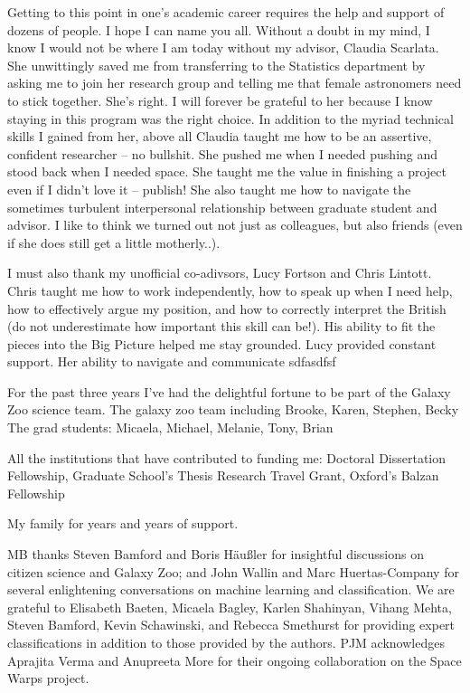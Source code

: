 

Getting to this point in one's academic career requires the help and support of dozens of people. I hope I can name you all. Without a doubt in my mind, I know I would not be where I am today without my advisor, Claudia Scarlata.  She unwittingly saved me from transferring to the Statistics department by asking me to join her research group and telling me that female astronomers need to stick together. She's right. I will forever be grateful to her because I know staying in this program was the right choice. In addition to the myriad technical skills I gained from her, above all Claudia taught me how to be an assertive, confident researcher -- no bullshit.  She pushed me when I needed pushing and stood back when I needed space. She taught me the value in finishing a project even if I didn't love it -- publish! She also taught me how to navigate the sometimes turbulent interpersonal relationship between graduate student and advisor. I like to think we turned out not just as colleagues, but also friends (even if she does still get a little motherly..).  

I must also thank my unofficial co-adivsors, Lucy Fortson and Chris Lintott.  Chris taught me how to work independently, how to speak up when I need help,  how to effectively argue my position, and how to correctly interpret the British (do not underestimate how important this skill can be!). His ability to fit the pieces into the Big Picture helped me stay grounded. Lucy provided constant support. Her ability to navigate and communicate sdfasdfsf


For the past three years I've had the delightful fortune to be part of the Galaxy Zoo science team. 
The galaxy zoo team including Brooke, Karen, Stephen, Becky
The grad students: Micaela, Michael, Melanie, Tony, Brian

All the institutions that have contributed to funding me: Doctoral Dissertation Fellowship, Graduate School's Thesis Research Travel Grant, Oxford's Balzan Fellowship

My family for years and years of support. 



MB thanks Steven Bamford and Boris H{\"a}u{\ss}ler for insightful discussions on citizen science and Galaxy Zoo; and John Wallin and Marc Huertas-Company for several enlightening conversations on machine learning and classification. 
We are grateful to Elisabeth Baeten, Micaela Bagley, Karlen Shahinyan, Vihang Mehta, Steven Bamford, Kevin Schawinski, and Rebecca Smethurst for providing expert classifications in addition to those provided by the authors. PJM acknowledges Aprajita Verma and Anupreeta More for their ongoing collaboration on the Space Warps project. 

